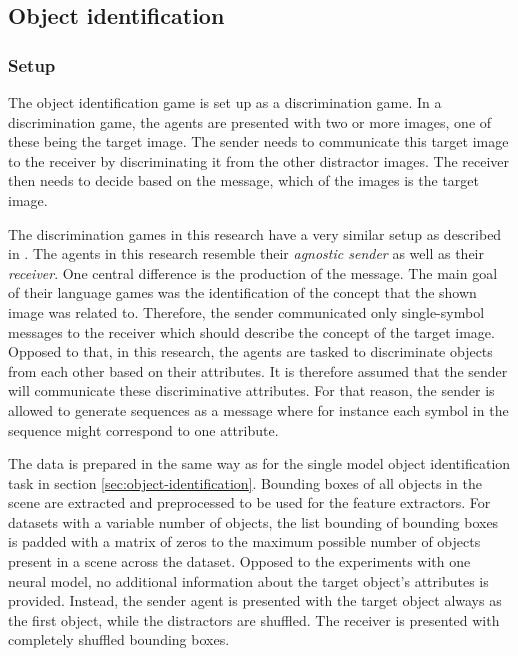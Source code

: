 \subsection{Object identification}
\label{sec:language-games:identification}

\subsubsection*{Setup}

The object identification game is set up as a discrimination game.
In a discrimination game, the agents are presented with two or more images, one of these being the target image.
The sender needs to communicate this target image to the receiver by discriminating it from the other distractor images.
The receiver then needs to decide based on the message, which of the images is the target image.

The discrimination games in this research have a very similar setup as described in \citep{Lazaridou2017}.
The agents in this research resemble their \emph{agnostic sender} as well as their \emph{receiver}.
One central difference is the production of the message.
The main goal of their language games was the identification of the concept that the shown image was related to.
Therefore, the sender communicated only single-symbol messages to the receiver which should describe the concept of the target image.
Opposed to that, in this research, the agents are tasked to discriminate objects from each other based on their attributes.
It is therefore assumed that the sender will communicate these discriminative attributes.
For that reason, the sender is allowed to generate sequences as a message where for instance each symbol in the sequence might correspond to one attribute.

The data is prepared in the same way as for the single model object identification task in section \ref{sec:object-identification}.
Bounding boxes of all objects in the scene are extracted and preprocessed to be used for the feature extractors.
For datasets with a variable number of objects, the list bounding of bounding boxes is padded with a matrix of zeros to the maximum possible number of objects present in a scene across the
dataset.
Opposed to the experiments with one neural model, no additional information about the target object's attributes is provided.
Instead, the sender agent is presented with the target object always as the first object, while the distractors are shuffled.
The receiver is presented with completely shuffled bounding boxes.

